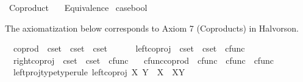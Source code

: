%
\begin{isabellebody}%
%
%
\isadelimtheory
%
\endisadelimtheory
%
\isatagtheory
{}\isamarkupfalse%
\ Coproduct\isanewline
\ \ \ Equivalence\isanewline
{}%
\endisatagtheory
{\isafoldtheory}%
%
\isadelimtheory
%
\endisadelimtheory
%
\isadelimdocument
%
\endisadelimdocument
%
\isatagdocument
%
\isamarkuptrue%
%
\endisatagdocument
{\isafolddocument}%
%
\isadelimdocument
%
\endisadelimdocument
{}\isamarkupfalse%
\ case{\isacharunderscore}{\kern0pt}bool%
\begin{isamarkuptext}%
The axiomatization below corresponds to Axiom 7 (Coproducts) in Halvorson.%
\end{isamarkuptext}\isamarkuptrue%
\isamarkupfalse%
\isanewline
\ \ coprod\ {\isacharcolon}{\kern0pt}{\isacharcolon}{\kern0pt}\ {\isachardoublequoteopen}cset\ {\isasymRightarrow}\ cset\ {\isasymRightarrow}\ cset{\isachardoublequoteclose}\ {\isacharparenleft}{\kern0pt}\ {\isachardoublequoteopen}{\isasymCoprod}{\isachardoublequoteclose}\ {}{}{\isacharparenright}{\kern0pt}\ \isanewline
\ \ left{\isacharunderscore}{\kern0pt}coproj\ {\isacharcolon}{\kern0pt}{\isacharcolon}{\kern0pt}\ {\isachardoublequoteopen}cset\ {\isasymRightarrow}\ cset\ {\isasymRightarrow}\ cfunc{\isachardoublequoteclose}\ \isanewline
\ \ right{\isacharunderscore}{\kern0pt}coproj\ {\isacharcolon}{\kern0pt}{\isacharcolon}{\kern0pt}\ {\isachardoublequoteopen}cset\ {\isasymRightarrow}\ cset\ {\isasymRightarrow}\ cfunc{\isachardoublequoteclose}\ \isanewline
\ \ cfunc{\isacharunderscore}{\kern0pt}coprod\ {\isacharcolon}{\kern0pt}{\isacharcolon}{\kern0pt}\ {\isachardoublequoteopen}cfunc\ {\isasymRightarrow}\ cfunc\ {\isasymRightarrow}\ cfunc{\isachardoublequoteclose}\ {\isacharparenleft}{\kern0pt}\ {\isachardoublequoteopen}{\isasymamalg}{\isachardoublequoteclose}\ {}{}{\isacharparenright}{\kern0pt}\isanewline
{}\isanewline
\ \ left{\isacharunderscore}{\kern0pt}proj{\isacharunderscore}{\kern0pt}type{\isacharbrackleft}{\kern0pt}type{\isacharunderscore}{\kern0pt}rule{\isacharbrackright}{\kern0pt}{\isacharcolon}{\kern0pt}\ {\isachardoublequoteopen}left{\isacharunderscore}{\kern0pt}coproj\ X\ Y\ {\isacharcolon}{\kern0pt}\ X\ {\isasymrightarrow}\ X{\isasymCoprod}Y{\isachardoublequoteclose}\ \isanewline

\end{isabellebody}
